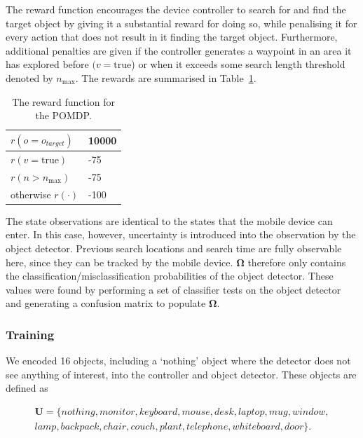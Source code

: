 \documentclass[runningheads]{llncs}
\begin{document}
The reward function encourages the device controller to search for and find the target object by giving it a substantial reward for doing so, while penalising it for every action that does not result in it finding the target object.
Furthermore, additional penalties are given if the controller generates a waypoint in an area it has explored before $(v = \textrm{true}$) or when it exceeds some search length threshold denoted by $n_{\max}$.
The rewards are summarised in Table~\ref{tab:rewards}.

\begin{table}
  \centering
  \caption{The reward function for the POMDP. }\label{tab:rewards}
  \begin{tabular}{p{3cm}p{1cm}}
    \toprule
    $r(o = o_{target})$ & 10000 \\ \midrule
    $r(v = \textrm{true})$  & -75 \\ \midrule
    $r(n > n_{\max})$ & -75 \\ \midrule
    otherwise $r(\cdot)$ & -100  \\ \midrule
    \bottomrule
  \end{tabular}
\end{table}

The state observations are identical to the states that the mobile device can enter. 
In this case, however, uncertainty is introduced into the observation by the object detector.
Previous search locations and search time are fully observable here, since they can be tracked by the mobile device.
$\mathbf{\Omega}$ therefore only contains the classification/misclassification probabilities of the object detector. 
These values were found by performing a set of classifier tests on the object detector and generating a confusion matrix to populate $\mathbf{\Omega}$.

\subsubsection{Training}

We encoded 16 objects, including a `nothing' object where the detector does not see anything of interest, into the controller and object detector.
These objects are defined as 

\begin{equation*}
  \begin{split}
    \mathbf{U} = \{ nothing, monitor, keyboard, mouse, desk, laptop, mug, window,\\ 
      lamp, backpack, chair, couch, plant, telephone, whiteboard, door \}.
  \end{split}
\end{equation*}
\end{document}
